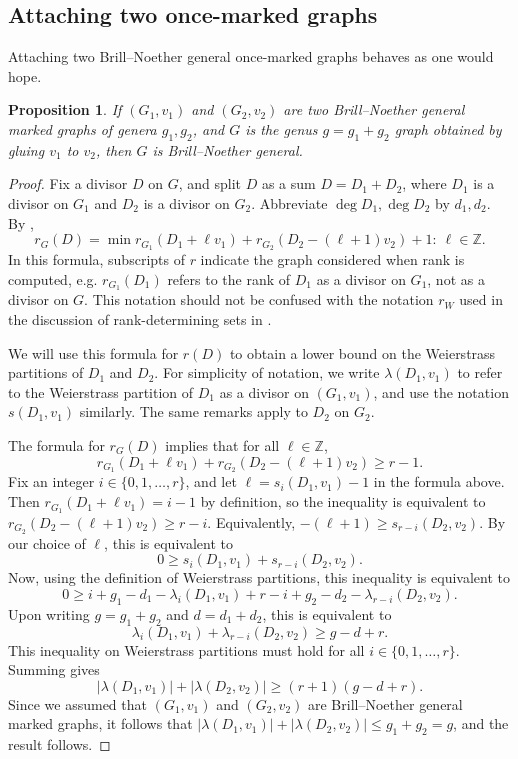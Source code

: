 \documentclass[11pt]{article}
\newtheorem{prop}[theo]{Proposition}
\theoremstyle{definition}
\numberwithin{equation}{section}
\newcommand{\Z}{\mathbb{Z}}
\begin{document}
\subsection{Attaching two once-marked graphs}

Attaching two Brill--Noether general once-marked graphs behaves as one would hope.

\begin{prop}\label{prop:glueMarked}
If $(G_1,v_1)$ and $(G_2,v_2)$ are two Brill--Noether general marked graphs of genera $g_1,g_2$, and $G$ is the genus $g = g_1+g_2$ graph obtained by gluing  $v_1$ to $v_2$, then $G$ is Brill--Noether general.
\end{prop}

\begin{proof}
Fix a divisor $D$ on $G$, and split $D$ as a sum $D = D_1 + D_2$, where $D_1$ is a divisor on $G_1$ and $D_2$ is a divisor on $G_2$. Abbreviate $\deg D_1, \deg D_2$ by $d_1,d_2$.  By \cite[Prop. 3.15]{Pfl22}, 
$$r_G(D) = \min{ r_{G_1}(D_1 + \ell v_1) + r_{G_2}(D_2 - (\ell+1) v_2) + 1:\ \ell \in \Z}.$$
In this formula, subscripts of $r$ indicate the graph considered when rank is computed, e.g. $r_{G_1}(D_1)$ refers to the rank of $D_1$ as a divisor on $G_1$, not as a divisor on $G$. This notation should not be confused with the notation $r_W$ used in the discussion of rank-determining sets in .

We will use this formula for $r(D)$ to obtain a lower bound on the Weierstrass partitions of $D_1$ and $D_2$. For simplicity of notation, we write $\lambda(D_1,v_1)$ to refer to the Weierstrass partition of $D_1$ as a divisor on $(G_1,v_1)$, and use the notation $s(D_1, v_1)$ similarly. The same remarks apply to $D_2$ on $G_2$. 

The formula for $r_G(D)$ implies that for all $\ell \in \Z$,
$$r_{G_1}(D_1 + \ell v_1) + r_{G_2}(D_2 - (\ell+1) v_2) \geq r-1.$$
Fix an integer $i \in \{0, 1, \ldots, r\}$, and let $\ell = s_i(D_1,v_1)-1$ in the formula above. Then $r_{G_1}(D_1 + \ell v_1) = i-1$ by definition, so the inequality is equivalent to
$r_{G_2}(D_2 - (\ell+1) v_2) \geq r - i$. Equivalently, $-(\ell+1) \geq s_{r-i}(D_2, v_2)$. By our choice of $\ell$, this is equivalent to 
$$0 \geq s_i(D_1,v_1) + s_{r-i}(D_2,v_2).$$
Now, using the definition of Weierstrass partitions, this inequality is equivalent to
$$ 0 \geq i + g_1 - d_1 - \lambda_i(D_1,v_1) + r-i + g_2 - d_2 - \lambda_{r-i}(D_2,v_2).$$
Upon writing $g = g_1 + g_2$ and $d = d_1 + d_2$, this is equivalent to
$$\lambda_i(D_1, v_1) + \lambda_{r-i}(D_2,v_2) \geq g-d+r.$$
This inequality on Weierstrass partitions must hold for all $i \in \{0, 1, \ldots, r\}$. Summing gives
$$ |\lambda(D_1,v_1)| + |\lambda(D_2,v_2)| \geq (r+1)(g-d+r).$$
Since we assumed that $(G_1,v_1)$ and $(G_2,v_2)$ are Brill--Noether general marked graphs, it follows that $|\lambda(D_1,v_1)| + |\lambda(D_2,v_2)| \leq g_1 + g_2 = g$, and the result follows.
\end{proof}
\end{document}
